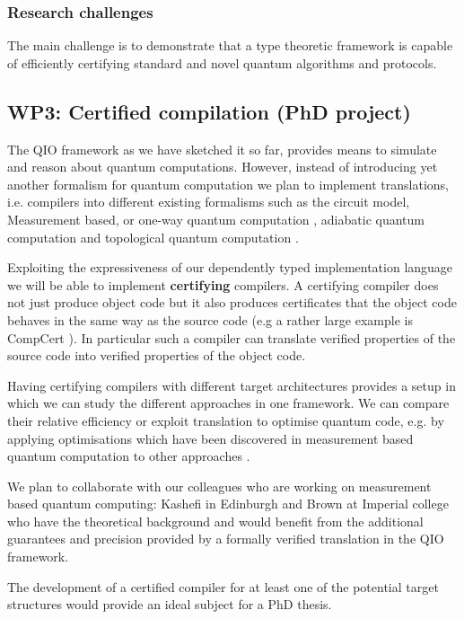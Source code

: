 \documentclass[a4paper]{article}
\begin{document}
\subsubsection*{Research challenges}

The main challenge is to demonstrate that a type theoretic framework
is capable of efficiently certifying standard and novel quantum
algorithms and protocols. 

\subsection*{WP3: Certified compilation (PhD project)}
\label{sec:wp3}

The QIO framework as we have sketched it so far, provides means to
simulate and reason about quantum computations. However, instead of
introducing yet another formalism for quantum computation we plan to
implement translations, i.e. compilers into different existing
formalisms such as the circuit model, Measurement based, or one-way
quantum computation ,
adiabatic quantum computation  and topological quantum
computation .

Exploiting the expressiveness of our dependently typed implementation
language we will be able to implement \textbf{certifying} compilers.
A certifying compiler does not just produce object code but it also
produces certificates that the object code behaves in the same way as
the source code (e.g a rather large example is CompCert
). In particular such a compiler can translate verified
properties of the source code into verified properties of the object
code. 

Having certifying compilers with different target architectures
provides a setup in which we can study the different approaches in one
framework. We can compare their relative efficiency or exploit
translation to optimise quantum code, e.g. by applying optimisations
which have been discovered in measurement based quantum computation to
other approaches .

We plan to collaborate with our colleagues who are working on
measurement based quantum computing: Kashefi in Edinburgh and
Brown at Imperial college who have the theoretical background and
would benefit from the additional guarantees and precision provided
by a formally verified translation in the QIO framework.

The development of a certified compiler for at least one of the
potential target structures would provide an ideal subject for a PhD
thesis. 
\end{document}

